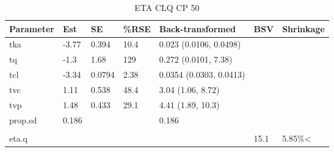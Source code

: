\begin{table}
\centering\centering
\caption{ETA CLQ CP 50}
\centering
\fontsize{8}{10}\selectfont
\begin{tabular}[t]{lllllll}
\toprule
\textbf{Parameter} & \textbf{Est} & \textbf{SE} & \textbf{\%RSE} & \textbf{Back-transformed} & \textbf{BSV} & \textbf{Shrinkage}\\
\midrule
tka & -3.77 & 0.394 & 10.4 & 0.023 (0.0106, 0.0498) &  & \\
\midrule
tq & -1.3 & 1.68 & 129 & 0.272 (0.0101, 7.38) &  & \\
\midrule
tcl & -3.34 & 0.0794 & 2.38 & 0.0354 (0.0303, 0.0413) &  & \\
\midrule
tvc & 1.11 & 0.538 & 48.4 & 3.04 (1.06, 8.72) &  & \\
\midrule
tvp & 1.48 & 0.433 & 29.1 & 4.41 (1.89, 10.3) &  & \\
\midrule
prop.sd & 0.186 &  &  & 0.186 &  & \\
\midrule\\
eta.q &  &  &  &  & 15.1 & 5.85\%<\\
\bottomrule
\end{tabular}
\end{table}